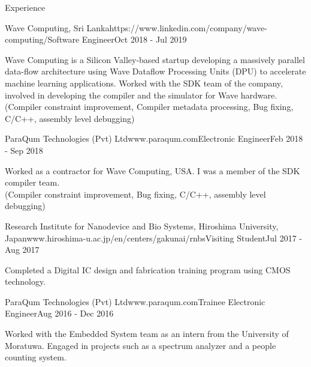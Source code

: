 \documentclass[
	11pt, %
]{./../assets/resume} %
\begin{document}
\begin{rSection}{Experience}
    \begin{rSubsectionX}{Wave Computing, Sri Lanka}{https://www.linkedin.com/company/wave-computing/}{Software Engineer}{Oct 2018 - Jul 2019}
        \item Wave Computing is a Silicon Valley-based startup developing a massively parallel data-flow architecture using Wave Dataflow Processing Units (DPU) to accelerate machine learning applications. Worked with the SDK team of the company, involved in developing the compiler and the simulator for Wave hardware.\\
        (Compiler constraint improvement, Compiler metadata processing, Bug fixing, C/C++, assembly level debugging)
    \end{rSubsectionX}

    \begin{rSubsectionX}{ParaQum Technologies (Pvt) Ltd}{www.paraqum.com}{Electronic Engineer}{Feb 2018 - Sep 2018}
        \item Worked as a contractor for Wave Computing, USA. I was a member of the SDK compiler team.\\
        (Compiler constraint improvement, Bug fixing, C/C++, assembly level debugging)
    \end{rSubsectionX}

    \begin{rSubsectionX}{Research Institute for Nanodevice and Bio Systems, Hiroshima University, Japan}{www.hiroshima-u.ac.jp/en/centers/gakunai/rnbs}{Visiting Student}{Jul 2017 - Aug 2017}
        \item Completed a Digital IC design and fabrication training program using CMOS technology.
    \end{rSubsectionX}

    \begin{rSubsectionX}{ParaQum Technologies (Pvt) Ltd}{www.paraqum.com}{Trainee Electronic Engineer}{Aug 2016 - Dec 2016}
        \item Worked with the Embedded System team as an intern from the University of Moratuwa. Engaged in projects such as a spectrum analyzer and a people counting system.
    \end{rSubsectionX}
\end{rSection}

\end{document}
